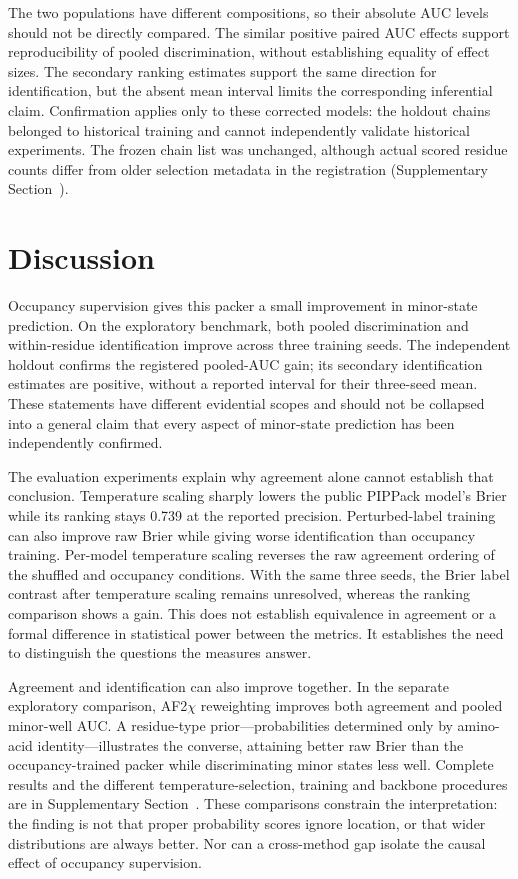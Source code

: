 \documentclass[10pt,twocolumn,a4paper]{article}
\begin{document}
The two populations have different compositions, so their absolute AUC levels should not be directly compared. The similar positive paired AUC effects support reproducibility of pooled discrimination, without establishing equality of effect sizes. The secondary ranking estimates support the same direction for identification, but the absent mean interval limits the corresponding inferential claim. Confirmation applies only to these corrected models: the holdout chains belonged to historical training and cannot independently validate historical experiments. The frozen chain list was unchanged, although actual scored residue counts differ from older selection metadata in the registration (Supplementary Section~).

\section{Discussion}
Occupancy supervision gives this packer a small improvement in minor-state prediction. On the exploratory benchmark, both pooled discrimination and within-residue identification improve across three training seeds. The independent holdout confirms the registered pooled-AUC gain; its secondary identification estimates are positive, without a reported interval for their three-seed mean. These statements have different evidential scopes and should not be collapsed into a general claim that every aspect of minor-state prediction has been independently confirmed.

The evaluation experiments explain why agreement alone cannot establish that conclusion. Temperature scaling sharply lowers the public PIPPack model's Brier while its ranking stays 0.739 at the reported precision. Perturbed-label training can also improve raw Brier while giving worse identification than occupancy training. Per-model temperature scaling reverses the raw agreement ordering of the shuffled and occupancy conditions. With the same three seeds, the Brier label contrast after temperature scaling remains unresolved, whereas the ranking comparison shows a gain. This does not establish equivalence in agreement or a formal difference in statistical power between the metrics. It establishes the need to distinguish the questions the measures answer.

Agreement and identification can also improve together. In the separate exploratory comparison, AF2$\chi$ reweighting improves both agreement and pooled minor-well AUC. A residue-type prior---probabilities determined only by amino-acid identity---illustrates the converse, attaining better raw Brier than the occupancy-trained packer while discriminating minor states less well. Complete results and the different temperature-selection, training and backbone procedures are in Supplementary Section~. These comparisons constrain the interpretation: the finding is not that proper probability scores ignore location, or that wider distributions are always better. Nor can a cross-method gap isolate the causal effect of occupancy supervision.
\end{document}
